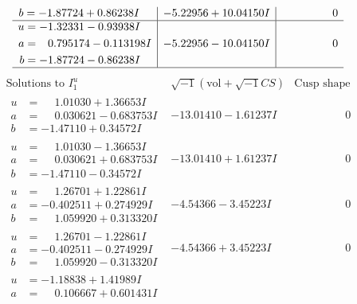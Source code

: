 \documentclass[1p]{elsarticle_modified}
\theoremstyle{definition}
\newcommand{\I}{\sqrt{-1}}
\begin{document}
$$\begin{array}{c|c|c}
\begin{aligned}
b &= -1.87724 + 0.86238 I\end{aligned}
 & -5.22956 + 10.04150 I & \phantom{-0.000000 } 0 \\ \hline\begin{aligned}
u &= -1.32331 - 0.93938 I \\
a &= \phantom{-}0.795174 - 0.113198 I \\
b &= -1.87724 - 0.86238 I\end{aligned}
 & -5.22956 - 10.04150 I & \phantom{-0.000000 } 0\\
 \hline 
 \end{array}$$\newpage$$\begin{array}{c|c|c}  
\text{Solutions to }I^u_{1}& \I (\text{vol} + \sqrt{-1}CS) & \text{Cusp shape}\\
 \hline 
\begin{aligned}
u &= \phantom{-}1.01030 + 1.36653 I \\
a &= \phantom{-}0.030621 - 0.683753 I \\
b &= -1.47110 + 0.34572 I\end{aligned}
 & -13.01410 - 1.61237 I & \phantom{-0.000000 } 0 \\ \hline\begin{aligned}
u &= \phantom{-}1.01030 - 1.36653 I \\
a &= \phantom{-}0.030621 + 0.683753 I \\
b &= -1.47110 - 0.34572 I\end{aligned}
 & -13.01410 + 1.61237 I & \phantom{-0.000000 } 0 \\ \hline\begin{aligned}
u &= \phantom{-}1.26701 + 1.22861 I \\
a &= -0.402511 + 0.274929 I \\
b &= \phantom{-}1.059920 + 0.313320 I\end{aligned}
 & -4.54366 - 3.45223 I & \phantom{-0.000000 } 0 \\ \hline\begin{aligned}
u &= \phantom{-}1.26701 - 1.22861 I \\
a &= -0.402511 - 0.274929 I \\
b &= \phantom{-}1.059920 - 0.313320 I\end{aligned}
 & -4.54366 + 3.45223 I & \phantom{-0.000000 } 0 \\ \hline\begin{aligned}
u &= -1.18838 + 1.41989 I \\
a &= \phantom{-}0.106667 + 0.601431 I \\

\end{aligned}
\end{array}$$
\end{document}
